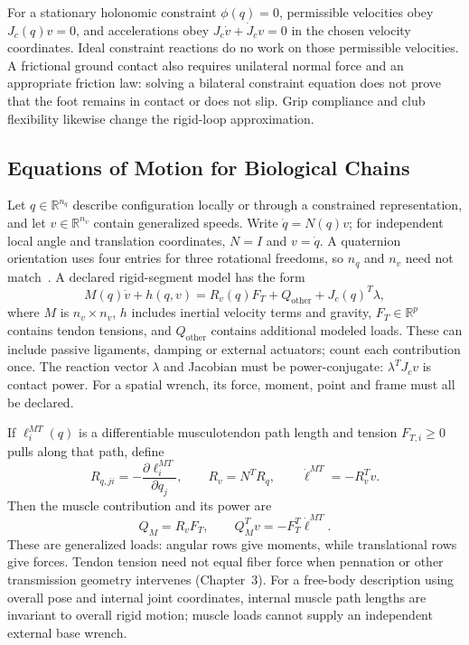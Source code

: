 For a stationary holonomic constraint $\phi(q)=0$, permissible velocities obey
$J_c(q)v=0$, and accelerations obey
$J_c\dot v+\dot J_c v=0$ in the chosen velocity coordinates.
Ideal constraint reactions do no work on those permissible velocities.
A frictional ground contact also requires unilateral normal force and an
appropriate friction law: solving a bilateral constraint equation does not
prove that the foot remains in contact or does not slip.
Grip compliance and club flexibility likewise change the rigid-loop approximation.

\subsection{Equations of Motion for Biological Chains}

Let $q\in\mathbb R^{n_q}$ describe configuration locally or through a constrained
representation, and let $v\in\mathbb R^{n_v}$ contain generalized speeds.
Write $\dot q=N(q)v$; for independent local angle and translation coordinates,
$N=I$ and $v=\dot q$. A quaternion orientation uses four entries for three
rotational freedoms, so $n_q$ and $n_v$ need not match~\cite{SimbodyMobilitiesBiological}.
A declared rigid-segment model has the form
\begin{equation}
 M(q)\dot v+h(q,v)=R_v(q)F_T+Q_{\mathrm{other}}+J_c(q)^T\lambda,
 \label{eq:ch5:eom-bio}
\end{equation}
where $M$ is $n_v\times n_v$, $h$ includes inertial velocity terms and gravity,
$F_T\in\mathbb R^p$ contains tendon tensions, and $Q_{\mathrm{other}}$ contains
additional modeled loads. These can include passive ligaments, damping or
external actuators; count each contribution once. The reaction vector $\lambda$
and Jacobian must be power-conjugate: $\lambda^TJ_cv$ is contact power.
For a spatial wrench, its force, moment, point and frame must all be declared.

If $\ell_i^{MT}(q)$ is a differentiable musculotendon path length and tension
$F_{T,i}\geq0$ pulls along that path, define
\[
 R_{q,ji}=-\frac{\partial\ell_i^{MT}}{\partial q_j},\qquad
 R_v=N^TR_q,\qquad \dot\ell^{MT}=-R_v^Tv.
\]
Then the muscle contribution and its power are
\begin{equation}
 Q_M=R_vF_T,\qquad Q_M^Tv=-F_T^T\dot\ell^{MT}.
 \label{eq:ch5:net-torque}
\end{equation}
These are generalized loads: angular rows give moments, while translational
rows give forces. Tendon tension need not equal fiber force when pennation or
other transmission geometry intervenes (Chapter~3).
For a free-body description using overall pose and internal joint coordinates,
internal muscle path lengths are invariant to overall rigid motion; muscle
loads cannot supply an independent external base wrench.

